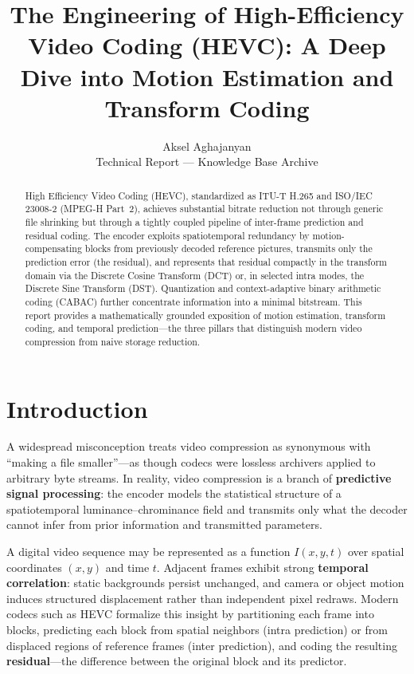 \documentclass[11pt,journal,onecolumn]{IEEEtran}
\begin{document}
\title{The Engineering of High-Efficiency Video Coding (HEVC): A Deep Dive into Motion Estimation and Transform Coding}

\author{Aksel Aghajanyan \\ \small Technical Report --- Knowledge Base Archive}

\maketitle

\begin{abstract}
High Efficiency Video Coding (HEVC), standardized as ITU-T H.265 and ISO/IEC 23008-2 (MPEG-H Part~2), achieves substantial bitrate reduction not through generic file shrinking but through a tightly coupled pipeline of inter-frame prediction and residual coding. The encoder exploits spatiotemporal redundancy by motion-compensating blocks from previously decoded reference pictures, transmits only the prediction error (the residual), and represents that residual compactly in the transform domain via the Discrete Cosine Transform (DCT) or, in selected intra modes, the Discrete Sine Transform (DST). Quantization and context-adaptive binary arithmetic coding (CABAC) further concentrate information into a minimal bitstream. This report provides a mathematically grounded exposition of motion estimation, transform coding, and temporal prediction---the three pillars that distinguish modern video compression from naive storage reduction.
\end{abstract}

\section{Introduction}
A widespread misconception treats video compression as synonymous with ``making a file smaller''---as though codecs were lossless archivers applied to arbitrary byte streams. In reality, video compression is a branch of \textbf{predictive signal processing}: the encoder models the statistical structure of a spatiotemporal luminance--chrominance field and transmits only what the decoder cannot infer from prior information and transmitted parameters.

A digital video sequence may be represented as a function $I(x, y, t)$ over spatial coordinates $(x, y)$ and time $t$. Adjacent frames exhibit strong \textbf{temporal correlation}: static backgrounds persist unchanged, and camera or object motion induces structured displacement rather than independent pixel redraws. Modern codecs such as HEVC formalize this insight by partitioning each frame into blocks, predicting each block from spatial neighbors (intra prediction) or from displaced regions of reference frames (inter prediction), and coding the resulting \textbf{residual}---the difference between the original block and its predictor.
\end{document}
